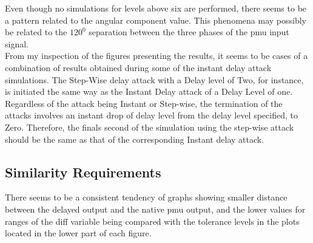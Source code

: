 Even though no simulations for levels above six are performed, there seems to be a pattern related to the angular component value. This phenomena may possibly be related to the $120^0$ separation between the three phases of the \acrshort{pmu} input signal.\\ 


From my inspection of the figures presenting the results, it seems to be cases of a combination of results obtained during some of the instant delay attack simulations. The Step-Wise delay attack with a Delay level of Two, for instance, is initiated the same way as the Instant Delay attack of a Delay Level of one.\\ 

Regardless of the attack being Instant or Step-wise, the termination of the attacks involves an instant drop of delay level from the delay level specified, to Zero. Therefore, the finals second of the simulation using the step-wise attack should be the same as that of the corresponding Instant delay attack.  



\subsection{Similarity Requirements}

There seems to be a consistent tendency of graphs showing smaller distance between the delayed output and the native \acrshort{pmu} output, and the lower values for ranges of the diff variable being compared with the tolerance levels in the plots located in the lower part of each figure.